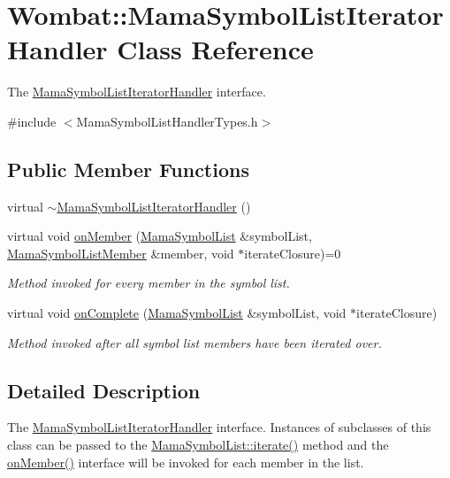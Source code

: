 \hypertarget{classWombat_1_1MamaSymbolListIteratorHandler}{
\section{Wombat::MamaSymbolListIteratorHandler Class Reference}
\label{classWombat_1_1MamaSymbolListIteratorHandler}
}


The \hyperlink{classWombat_1_1MamaSymbolListIteratorHandler}{MamaSymbolListIteratorHandler} interface.  


{\ttfamily \#include $<$MamaSymbolListHandlerTypes.h$>$}\subsection*{Public Member Functions}
\begin{DoxyCompactItemize}
\item 
virtual \hyperlink{classWombat_1_1MamaSymbolListIteratorHandler_a966643ab28fd12c6c2182cc5ba9cc1da}{$\sim$MamaSymbolListIteratorHandler} ()
\item 
virtual void \hyperlink{classWombat_1_1MamaSymbolListIteratorHandler_a4473a13b92c04377588fe0178ad04dad}{onMember} (\hyperlink{classWombat_1_1MamaSymbolList}{MamaSymbolList} \&symbolList, \hyperlink{classWombat_1_1MamaSymbolListMember}{MamaSymbolListMember} \&member, void $\ast$iterateClosure)=0
\begin{DoxyCompactList}\small\item\em Method invoked for every member in the symbol list. \item\end{DoxyCompactList}\item 
virtual void \hyperlink{classWombat_1_1MamaSymbolListIteratorHandler_a71f422a7d26ac1817a256e21086185d0}{onComplete} (\hyperlink{classWombat_1_1MamaSymbolList}{MamaSymbolList} \&symbolList, void $\ast$iterateClosure)
\begin{DoxyCompactList}\small\item\em Method invoked after all symbol list members have been iterated over. \item\end{DoxyCompactList}\end{DoxyCompactItemize}


\subsection{Detailed Description}
The \hyperlink{classWombat_1_1MamaSymbolListIteratorHandler}{MamaSymbolListIteratorHandler} interface. Instances of subclasses of this class can be passed to the \hyperlink{classWombat_1_1MamaSymbolList_abd26a14e154744f08713aab75c9aece3}{MamaSymbolList::iterate()} method and the \hyperlink{classWombat_1_1MamaSymbolListIteratorHandler_a4473a13b92c04377588fe0178ad04dad}{onMember()} interface will be invoked for each member in the list. 

